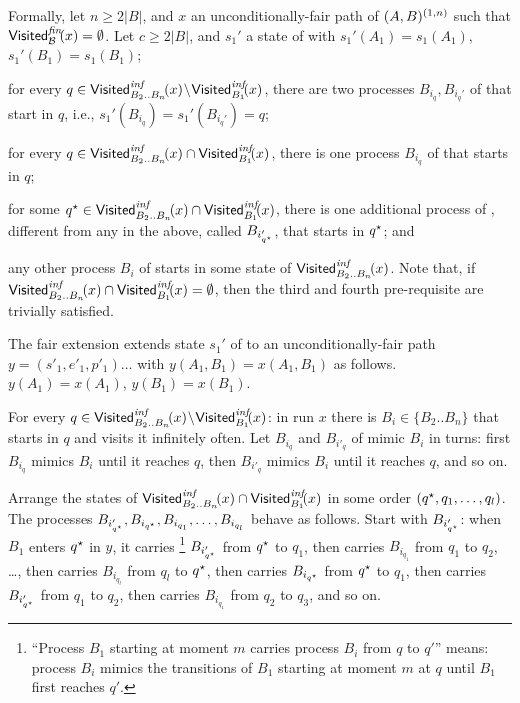Formally, let $n \geq 2|B|$, and $x$ an unconditionally-fair path of $(A,B)^{(1,n)}$ such that
$\mathsf{Visited}^{\textit{fin}}_{\mathcal{B}}\!(x)=\emptyset$.
Let $c \geq 2|B|$, and $s_1'$ a state of \cutoffsys
with
\li
\- $s_1'(A_1)=s_1(A_1)$, $s_1'(B_1)=s_1(B_1)$;

\- for every $q \in \mathsf{Visited}^{\textit{inf}}_{B_2..B_n}\!(x) \!\setminus\! \mathsf{Visited}^{\textit{inf}}_{B_1}\!(x)$,
   there are two processes $B_{i_q}, B_{i_q'}$ of \cutoffsys
   that start in $q$, i.e., $s_1'(B_{i_q})=s_1'(B_{i_q'})=q$;

\- for every $q \in \mathsf{Visited}^{\textit{inf}}_{B_2..B_n}\!(x) \cap \mathsf{Visited}^{\textit{inf}}_{B_1}\!(x)$,
   there is one process $B_{i_q}$ of \cutoffsys
   that starts in $q$;

\- for some ${q^\star} \in \mathsf{Visited}^{\textit{inf}}_{B_2..B_n}\!(x) \cap \mathsf{Visited}^{\textit{inf}}_{B_1}\!(x)$,
   there is one additional process of \cutoffsys, 
   different from any in the above, 
   called $B_{i_{q^\star}'}$,
   that starts in ${q^\star}$;
   and

\- any other process $B_i$ of \cutoffsys 
   starts in some state of $\mathsf{Visited}^{\textit{inf}}_{B_2..B_n}\!(x)$.
\il
Note that, if $\mathsf{Visited}^{\textit{inf}}_{B_2..B_n}\!(x)\cap \mathsf{Visited}^{\textit{inf}}_{B_1}\!(x) = \emptyset$, 
then the third and fourth pre-requisite are trivially satisfied.

The fair extension extends state $s_1'$ of \cutoffsys 
to an unconditionally-fair path $y=(s'_1,e'_1,p'_1)\ldots$ 
with $y(A_1,B_1) = x(A_1,B_1)$ as follows.
\li
\-[(a)] $y(A_1)=x(A_1)$, $y(B_1)=x(B_1)$.

\-[(b)] For every $q \in \mathsf{Visited}^{\textit{inf}}_{B_2..B_n}\!(x) \!\setminus\! \mathsf{Visited}^{\textit{inf}}_{B_1}\!(x)$: 
       in run $x$ there is $B_i \in \{B_2..B_n\}$ 
       that starts in $q$ and visits it infinitely often. 
       Let $B_{i_q}$ and $B_{i'_q}$ of \cutoffsys mimic $B_i$ in turns: 
       first $B_{i_q}$ mimics $B_i$ until it reaches $q$, 
       then $B_{i'_q}$ mimics $B_i$ until it reaches $q$, and so on.

\-[(c)] Arrange the states of $\mathsf{Visited}^{\textit{inf}}_{B_2..B_n}\!(x)\cap \mathsf{Visited}^{\textit{inf}}_{B_1}\!(x)$ 
       in some order $({q^\star}, q_1, \ldots, q_l)$.  
       The processes $B_{i_{q^\star}'}, B_{i_{q^\star}}, B_{i_{q_1}}, \ldots, B_{i_{q_l}}$ 
       behave as follows.
       Start with $B_{i_{q^\star}'}$: 
       when $B_1$ enters ${q^\star}$ in $y$, it carries%
       \footnote{``Process $B_1$ starting at moment $m$ carries process $B_i$ 
                 from $q$ to $q'$'' means: process $B_i$ mimics 
                 the transitions of $B_1$ starting at moment $m$ at $q$ 
                 until $B_1$ first reaches $q'$.}
       $B_{i_{q^\star}'}$             from ${q^\star}$ to $q_1$, 
       then carries $B_{i_{q_1}}$ from $q_1$ to $q_2$, \ldots, 
       then carries $B_{i_{q_l}}$ from $q_l$ to ${q^\star}$, 
       then carries $B_{i_{q^\star}}$ from ${q^\star}$ to $q_1$, 
       then carries $B_{i_{q^\star}'}$ from $q_1$ to $q_2$, 
       then carries $B_{i_{q_1}}$ from $q_2$ to $q_3$,
       and so on.

